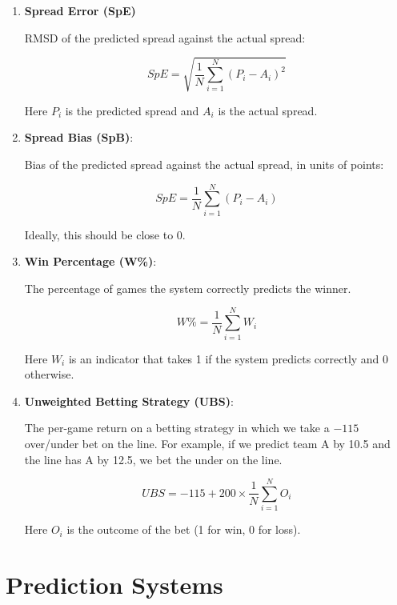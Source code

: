 \documentclass{report}
\begin{document}
\begin{enumerate}
    \item \textbf{Spread Error (SpE)}

    RMSD of the predicted spread against the actual spread:

    \begin{equation}
        SpE = \sqrt{\frac{1}{N}\sum_{i=1}^{N}(P_i - A_i)^2}
    \end{equation}

    Here $P_i$ is the predicted spread and $A_i$ is the actual spread.

    \item \textbf{Spread Bias (SpB)}:

    Bias of the predicted spread against the actual spread, in units of points:

    \begin{equation}
        SpE = \frac{1}{N}\sum_{i=1}^{N}(P_i - A_i)
    \end{equation}

    Ideally, this should be close to 0.

    \item \textbf{Win Percentage (W\%)}:
    
    The percentage of games the system correctly predicts the winner.

    \begin{equation}
        W\% = \frac{1}{N}\sum_{i=1}^{N}W_i
    \end{equation}

    Here $W_i$ is an indicator that takes 1 if the system predicts correctly and 0 otherwise.

    \item \textbf{Unweighted Betting Strategy (UBS)}:
    
    The per-game return on a betting strategy in which we take a $-115$ over/under bet on the line.
    For example, if we predict team A by 10.5 and the line has A by 12.5, we bet the under on the line.

    \begin{equation}
        UBS = -115 + 200\times\frac{1}{N}\sum_{i=1}^{N}O_i
    \end{equation}

    Here $O_i$ is the outcome of the bet (1 for win, 0 for loss).
\end{enumerate}

\section{Prediction Systems}
\end{document}
